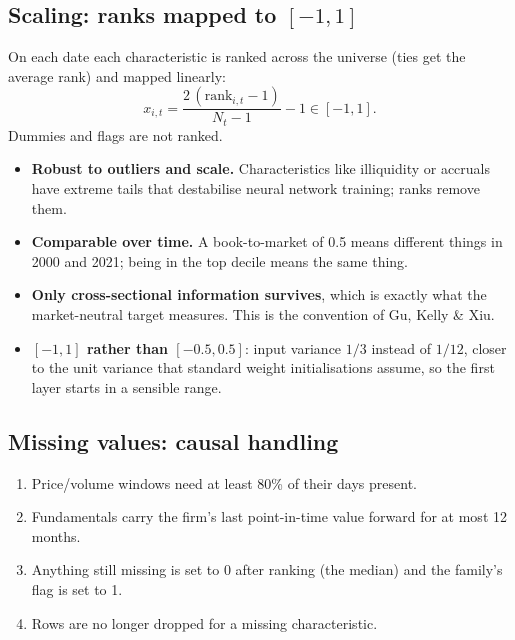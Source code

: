 \subsection{Scaling: ranks mapped to $[-1,1]$}

 On each date each characteristic is ranked across the universe (ties get the
average rank) and mapped linearly:
\begin{equation}
x_{i,t} = \frac{2\,(\mathrm{rank}_{i,t}-1)}{N_t-1}-1 \in [-1,1].
\end{equation}
Dummies and flags are not ranked.

\begin{whybox}
\begin{itemize}
\item \textbf{Robust to outliers and scale.} Characteristics like illiquidity or accruals have extreme tails
  that destabilise neural network training; ranks remove them.
\item \textbf{Comparable over time.} A book-to-market of 0.5 means different things in 2000 and 2021; being in
  the top decile means the same thing.
\item \textbf{Only cross-sectional information survives}, which is exactly what the market-neutral target
  measures. This is the convention of Gu, Kelly \& Xiu.
\item \textbf{$[-1,1]$ rather than $[-0.5,0.5]$}: input variance $1/3$ instead of $1/12$, closer to the unit
  variance that standard weight initialisations assume, so the first layer starts in a sensible range.
\end{itemize}
\end{whybox}

\subsection{Missing values: causal handling}

\begin{enumerate}
\item Price/volume windows need at least 80\% of their days present.
\item Fundamentals carry the firm's last point-in-time value forward for at most 12 months.
\item Anything still missing is set to 0 after ranking (the median) and the family's flag is set to 1.
\item Rows are no longer dropped for a missing characteristic.
\end{enumerate}

